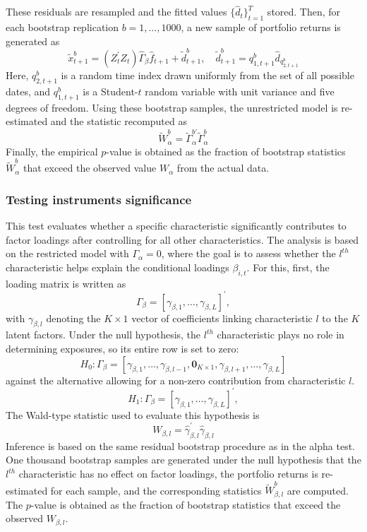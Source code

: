 \documentclass[
  12pt,
  a4paper,
  openany]{scrbook}
\begin{document}
These residuals are resampled and the fitted values
\({\{\hat d_t}\}_{t=1}^T\) stored. Then, for each bootstrap replication
\(b=1, \dots, 1000\), a new sample of portfolio returns is generated as
\[
\tilde x_{t+1}^b = (Z_t^\prime Z_t)\hat \Gamma_\beta \hat{f}_{t+1} + \tilde d^b_{t+1}, \quad
\tilde d^b_{t+1} = q_{1,t+1}^b \hat{d}_{q^b_{2,t+1}}
\] Here, \(q_{2,t+1}^b\) is a random time index drawn uniformly from the
set of all possible dates, and \(q_{1,t+1}^b\) is a Student-\(t\) random
variable with unit variance and five degrees of freedom. Using these
bootstrap samples, the unrestricted model is re-estimated and the
statistic recomputed as \[
\tilde{W}^b_\alpha = \tilde\Gamma^{b\prime}_\alpha\tilde\Gamma^b_\alpha
\] Finally, the empirical \(p\)-value is obtained as the fraction of
bootstrap statistics \(\tilde W_\alpha^b\) that exceed the observed
value \(W_\alpha\) from the actual data.

\subsubsection{Testing instruments significance}\label{sec-char-test}

This test evaluates whether a specific characteristic significantly
contributes to factor loadings after controlling for all other
characteristics. The analysis is based on the restricted model with
\(\Gamma_\alpha = 0\), where the goal is to assess whether the
\(l^{th}\) characteristic helps explain the conditional loadings
\(\beta_{i,t}\). For this, first, the loading matrix is written as \[
\Gamma_\beta = [\gamma_{\beta, 1}, \dots,\gamma_{\beta,L}]^\prime,
\] with \(\gamma_{\beta,l}\) denoting the \(K \times 1\) vector of
coefficients linking characteristic \(l\) to the \(K\) latent factors.
Under the null hypothesis, the \(l^{th}\) characteristic plays no role
in determining exposures, so its entire row is set to zero: \[
H_0 : \Gamma_\beta = [\gamma_{\beta, 1}, \dots, \gamma_{\beta, l-1}, \mathbf{0}_{K \times 1}, \gamma_{\beta, l+1}, \dots, \gamma_{\beta, L}]
\] against the alternative allowing for a non-zero contribution from
characteristic \(l\). \[
H_1 : \Gamma_\beta = [\gamma_{\beta, 1}, \dots,\gamma_{\beta,L}]^\prime,
\] The Wald-type statistic used to evaluate this hypothesis is \[
W_{\beta,l} = \hat\gamma^\prime_{\beta,l}\hat\gamma_{\beta,l}
\] Inference is based on the same residual bootstrap procedure as in the
alpha test. One thousand bootstrap samples are generated under the null
hypothesis that the \(l^{th}\) characteristic has no effect on factor
loadings, the portfolio returns is re-estimated for each sample, and the
corresponding statistics \(\tilde W_{\beta,l}^b\) are computed. The
\(p\)-value is obtained as the fraction of bootstrap statistics that
exceed the observed \(W_{\beta,l}\).
\end{document}
